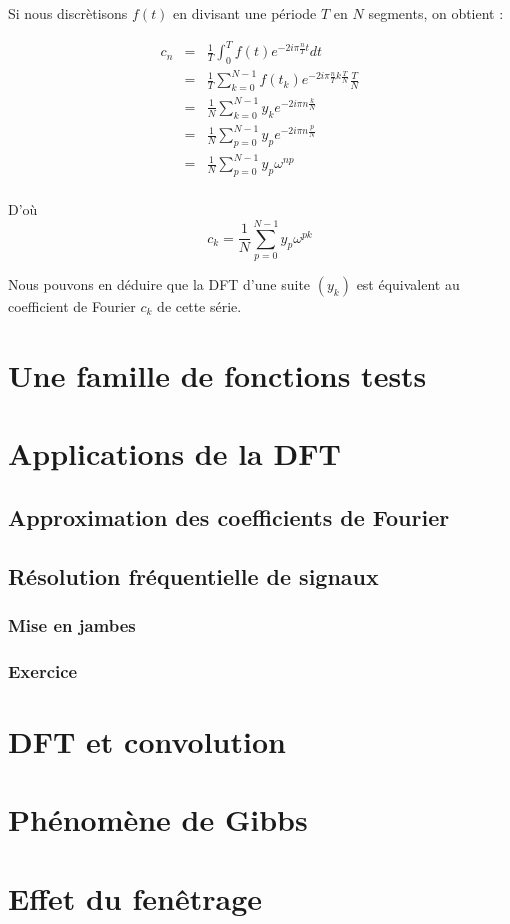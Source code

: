 \documentclass[a4paper,12pt]{report}
\begin{document}
	Si nous discr\`etisons $f(t)$ en divisant une p\'eriode $T$ en $N$ segments, on obtient :

	\begin{eqnarray*}
		c_{n}&=&\frac{1}{T}\int_{0}^{T}f(t)e^{-2i\pi \frac{n}{T}t}dt\\
		&=&\frac{1}{T}\sum_{k=0}^{N-1}f(t_{k})e^{-2i\pi \frac{n}{T}k\frac{T}{N}}\frac{T}{N}\\
		&=&\frac{1}{N}\sum_{k=0}^{N-1}y_{k}e^{-2i\pi n\frac{k}{N}}\\
		&=&\frac{1}{N}\sum_{p=0}^{N-1}y_{p}e^{-2i\pi n\frac{p}{N}}\\
		&=&\frac{1}{N}\sum_{p=0}^{N-1}y_{p}\omega^{np}\\
	\end{eqnarray*}

	D'o\`u \[c_{k}=\frac{1}{N}\sum_{p=0}^{N-1}y_{p}\omega^{pk}\]

	Nous pouvons en d\'eduire que la DFT d'une suite $(y_{k})$ est \'equivalent au coefficient de Fourier $c_{k}$ de cette s\'erie.
	
\chapter{Une famille de fonctions tests}

\chapter{Applications de la DFT}

	\section{Approximation des coefficients de Fourier}

	\section{R\'esolution fr\'equentielle de signaux}

		\subsection{Mise en jambes}

		\subsection{Exercice}

\chapter{DFT et convolution}

\chapter{Ph\'enom\`ene de Gibbs}

\chapter{Effet du fen\^etrage}

\listoffigures
\end{document}
